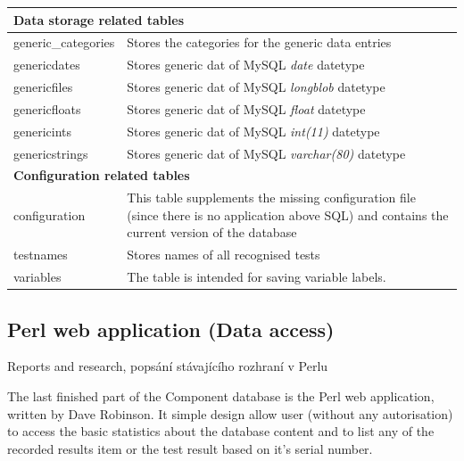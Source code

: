 \begin{longtable}{|p{4cm}|p{10cm}|}
		\multicolumn{2}{l}{\textbf{Data storage related tables}} \\ \hline
		generic\_categories & Stores the categories for the generic data entries\\ \hline
		genericdates & Stores generic dat of MySQL \emph{date} datetype\\ \hline
		genericfiles & Stores generic dat of MySQL \emph{longblob} datetype\\ \hline
		genericfloats & Stores generic dat of MySQL \emph{float} datetype\\ \hline
		genericints & Stores generic dat of MySQL \emph{int(11)} datetype\\ \hline
		genericstrings & Stores generic dat of MySQL \emph{varchar(80)} datetype \\ \hline
		


		\multicolumn{2}{l}{\textbf{Configuration related tables}} \\ \hline
		configuration & This table supplements the missing configuration file (since there is no application above SQL) and contains the current version of the database \\ \hline
		testnames &  Stores names of all recognised tests \\ \hline
		variables & The table is intended for saving variable labels. \\ \hline
		
\end{longtable}




\subsection{Perl web application (Data access)}

\par Reports and research, popsání stávajícího rozhraní v Perlu

\par The last finished part of the Component database is the Perl web application, written by Dave Robinson. It simple design allow user (without any autorisation) to access the basic statistics about the database content and to list any of the recorded results item or the test result based on it's serial number.

